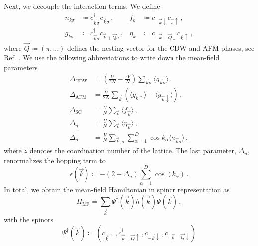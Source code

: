 \documentclass[
    reprint, 
    aps,
    preprintnumbers,
    twocolumn,
    prb,
    superscriptaddress
]{revtex4-2}
\newcommand{\vk}{\vec{k}}
\newcommand{\vQ}{\vec{Q}}
\newcommand{\up}{\uparrow}
\newcommand{\down}{\downarrow}
\newcommand{\kplusQ}{\vk+\vQ}
\newcommand{\kminusQ}{-\vk-\vQ}
\begin{document}
Next, we decouple the interaction terms.
We define 
\begin{equation}
    \label{eqn:operators}
    \begin{aligned}
        n_{k\sigma} &\coloneqq  c_{\vk\sigma}^\dagger c_{\vk\sigma}\,,      &f_k     &\coloneqq  c_{-\vk\down} c_{\vk\up}\,, \\
        g_{k\sigma} &\coloneqq  c_{\vk\sigma}^\dagger c_{\vk+\vQ\sigma}\,,  &\eta_k  &\coloneqq  c_{-\vk-\vQ\down} c_{\vk\up}\,,
    \end{aligned}
\end{equation}
where $\vQ \coloneqq  (\pi, ...)$ defines the nesting vector for the CDW and AFM phases, see Ref. \cite{sentef17}.
We use the following abbreviations to write down the mean-field parameters
\begin{subequations}
    \begin{align}
        \label{eqn:delta_cdw}
        \Delta_\text{CDW} &= \left(\frac{U}{2N} - \frac{zV}{N}\right) \sum_{\vk\sigma} \langle g_{\vk\sigma} \rangle\,, \\
        \label{eqn:delta_afm}
        \Delta_\text{AFM} &= \frac{U}{2N} \sum_{\vk} \left( \langle g_{k\uparrow} \rangle - \langle g_{\vk\downarrow} \rangle \right)\,, \\
        \Delta_\text{SC} &= \frac{U}{N} \sum_{\vk} \langle f_{\vk} \rangle\,, \\
        \Delta_\eta &= \frac{U}{N} \sum_{\vk} \langle \eta_{\vk} \rangle\,, \\
        \Delta_n &= \frac{V}{N} \sum_{\vk,\sigma} \sum_{\alpha=1}^D \cos k_\alpha \langle n_{\vk\sigma} \rangle\,,
    \end{align}
\end{subequations}
where $z$ denotes the coordination number of the lattice.
The last parameter, $\Delta_n$, renormalizes the hopping term to
\begin{equation}
    \epsilon( \vk ) \coloneqq  -(2 + \Delta_n) \sum_{\alpha=1}^D \cos(k_\alpha)\,.
\end{equation}
In total, we obtain the mean-field Hamiltonian in spinor representation as
\begin{equation}
    \label{eqn:mf_hamiltonian}
    H_\text{MF} = \sum_{\vk} \Psi^\dagger (\vk) h(\vk) \Psi (\vk)\,,
\end{equation}
with the spinors
\begin{equation}
    \Psi^\dagger (\vk) \coloneqq  \left( c_{\vk\up}^\dagger\,, c_{\kplusQ\up}^\dagger\,, c_{-\vk\down}\,, c_{\kminusQ\down} \right)
\end{equation}
\end{document}

